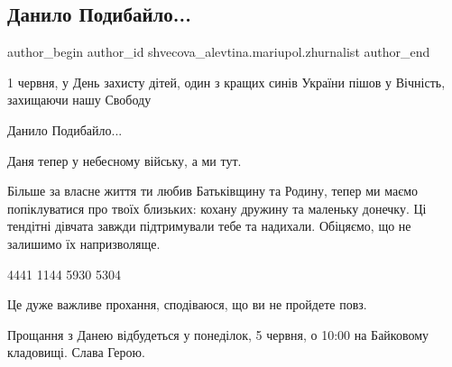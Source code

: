  
 
 
 
 

\subsection{Данило Подибайло...}
\label{sec:04_06_2023.fb.shvecova_alevtina.mariupol.zhurnalist.1.danylo_podybajlo}

\ifcmt
 author_begin
   author_id shvecova_alevtina.mariupol.zhurnalist
 author_end
\fi

1 червня, у День захисту дітей, один з кращих синів України пішов у Вічність,
захищаючи нашу Свободу

Данило Подибайло...

Даня тепер у небесному війську, а ми тут. 

Більше за власне життя ти любив Батьківщину та Родину, тепер ми маємо
попіклуватися про твоїх близьких: кохану дружину та маленьку донечку. Ці
тендітні дівчата завжди підтримували тебе та надихали. Обіцяємо, що не залишимо
їх напризволяще.

4441 1144 5930 5304 

Це дуже важливе прохання, сподіваюся, що ви не пройдете повз. 

Прощання з Данею відбудеться у понеділок, 5 червня, о 10:00 на Байковому
кладовищі. Слава Герою.
